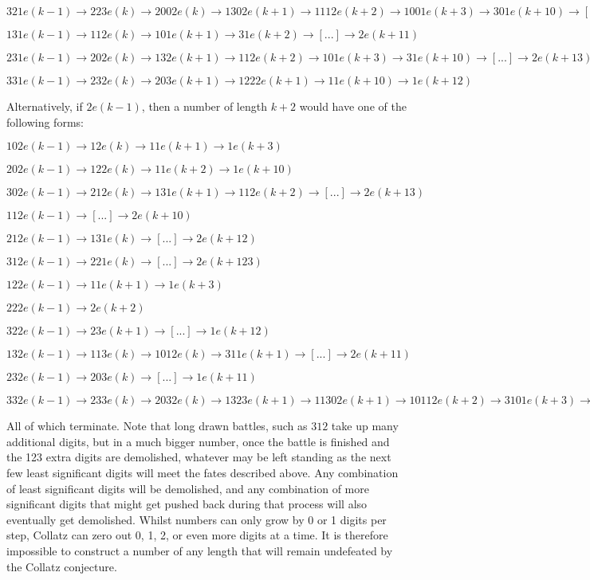 \documentclass{proc-l}
\theoremstyle{definition}
\theoremstyle{remark}
\numberwithin{equation}{section}
\begin{document}
$321e(k-1) \rightarrow 223e(k) \rightarrow 2002e(k) \rightarrow 1302e(k+1) \rightarrow 1112e(k+2) \rightarrow 1001e(k+3) \rightarrow 301e(k+10) \rightarrow [...] \rightarrow 2e(k+30)$

$131e(k-1) \rightarrow 112e(k) \rightarrow 101e(k+1) \rightarrow 31e(k+2) \rightarrow [...] \rightarrow 2e(k+11) $

$231e(k-1) \rightarrow 202e(k) \rightarrow 132e(k+1) \rightarrow 112e(k+2) \rightarrow 101e(k+3) \rightarrow 31e(k+10) \rightarrow [...] \rightarrow 2e(k+13)$

$331e(k-1) \rightarrow 232e(k) \rightarrow 203e(k+1) \rightarrow 1222e(k+1) \rightarrow 11e(k+10) \rightarrow 1e(k+12)$


Alternatively, if $2e(k-1)$, then a number of length $k+2$ would have one of the following forms:

$102e(k-1) \rightarrow 12e(k) \rightarrow 11e(k+1) \rightarrow 1e(k+3)$

$202e(k-1) \rightarrow 122e(k) \rightarrow 11e(k+2) \rightarrow 1e(k+10)$

$302e(k-1) \rightarrow 212e(k) \rightarrow 131e(k+1) \rightarrow 112e(k+2) \rightarrow [...] \rightarrow 2e(k+13)$

$112e(k-1) \rightarrow [...] \rightarrow 2e(k+10)$

$212e(k-1) \rightarrow 131e(k) \rightarrow [...] \rightarrow 2e(k+12)$

$312e(k-1) \rightarrow 221e(k) \rightarrow [...] \rightarrow 2e(k+123)$

$122e(k-1) \rightarrow 11e(k+1) \rightarrow 1e(k+3)$

$222e(k-1) \rightarrow 2e(k+2)$

$322e(k-1) \rightarrow 23e(k+1) \rightarrow [...] \rightarrow 1e(k+12)$

$132e(k-1) \rightarrow 113e(k) \rightarrow 1012e(k) \rightarrow 311e(k+1) \rightarrow [...] \rightarrow 2e(k+11)$

$232e(k-1) \rightarrow 203e(k) \rightarrow [...] \rightarrow 1e(k+11)$

$332e(k-1) \rightarrow 233e(k) \rightarrow 2032e(k) \rightarrow 1323e(k+1) \rightarrow 11302e(k+1) \rightarrow 10112e(k+2) \rightarrow 3101e(k+3) \rightarrow 2131e(k+10) \rightarrow 1312e(k+11) \rightarrow 1121e(k+12) \rightarrow 1003e(k+13) \rightarrow 3022e(k+13) \rightarrow 212e(k+21) \rightarrow [...] \rightarrow 2e(k+100)$

All of which terminate. 
Note that long drawn battles, such as $312$ take up many additional digits, but in a much bigger number, once the battle is finished and the 123 extra digits are demolished, whatever may be left standing as the next few least significant digits will meet the fates described above. Any combination of least significant digits will be demolished, and any combination of more significant digits that might get pushed back during that process will also eventually get demolished. Whilst numbers can only grow by 0 or 1 digits per step, Collatz can zero out 0, 1, 2, or even more digits at a time.
It is therefore impossible to construct a number of any length that will remain undefeated by the Collatz conjecture.
\end{document}
